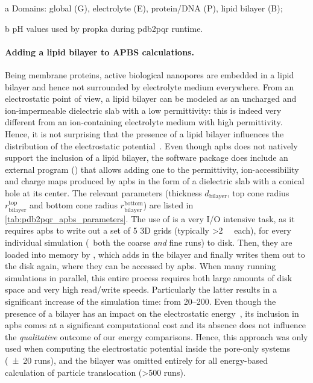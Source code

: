 {\begin{landscape}
\begin{threeparttable}[p]
    \begin{tablenotes}
     \item[a] Domains: global (G), electrolyte (E), protein/DNA (P), lipid bilayer (B);
     \item[b] pH values used by \gls{propka} during \gls{pdb2pqr} runtime.
    \end{tablenotes}
  
  \end{threeparttable}
\end{landscape}
}
%
%

\paragraph{Adding a lipid bilayer to APBS calculations.}
%
Being membrane proteins, active biological nanopores are embedded in a lipid bilayer and hence not surrounded
by electrolyte medium everywhere. From an electrostatic point of view, a lipid bilayer can be modeled as an
uncharged and ion-impermeable dielectric slab with a low permittivity: this is indeed very different from an
ion-containing electrolyte medium with high permittivity. Hence, it is not surprising that the presence of a
lipid bilayer influences the distribution of the electrostatic potential~\cite{Homeyer-2015}. Even though
\Gls{apbs} does not natively support the inclusion of a lipid bilayer, the software package does include an
external program () that allows adding one to the permittivity, ion-accessibility and
charge maps produced by \gls{apbs} in the form of a dielectric slab with a conical hole at its center. The
relevant parameters (thickness $d_{\textrm{bilayer}}$, top cone radius $r_{\textrm{bilayer}}^{\textrm{top}}$
and bottom cone radius $r_{\textrm{bilayer}}^{\textrm{bottom}}$) are listed in
\cref{tab:pdb2pqr_apbs_parameters}. The use of  is a very I/O intensive task, as it
requires \gls{apbs} to write out a set of 5 3D grids (typically \SI{>2}{\gibi\byte} each), for every
individual simulation (\ie~both the coarse \emph{and} fine runs) to disk. Then, they are loaded into memory by
, which adds in the bilayer and finally writes them out to the disk again, where they
can be accessed by \gls{apbs}. When many running simulations in parallel, this entire process requires both
large amounts of disk space and very high read/write speeds. Particularly the latter results in a significant
increase of the simulation time: from \SIrange{20}{200}{\min}. Even though the presence of a bilayer has an
impact on the electrostatic energy~\cite{Bonthuis-2006}, its inclusion in \gls{apbs} comes at a significant
computational cost and its absence does not influence the \emph{qualitative} outcome of our energy
comparisons. Hence, this approach was only used when computing the electrostatic potential inside the
pore-only systems (\num{\pm20} runs), and the bilayer was omitted entirely for all energy-based calculation of
particle translocation (\num{>500} runs).  


